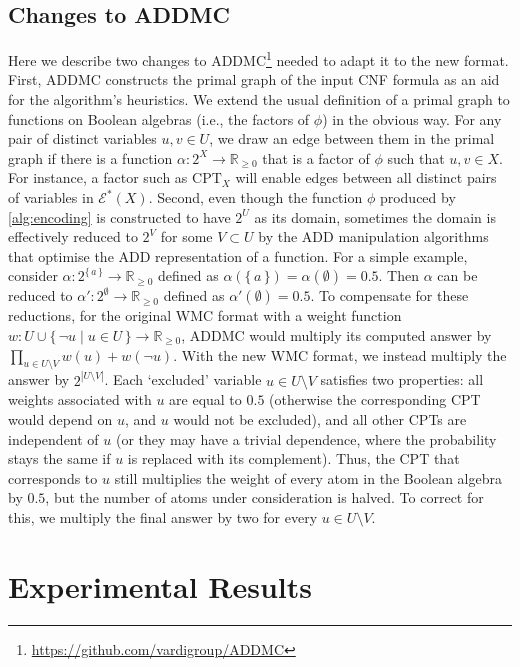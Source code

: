 \subsection{Changes to \textsc{ADDMC}}

Here we describe two changes to
\textsc{ADDMC}\footnote{\url{https://github.com/vardigroup/ADDMC}}
\citep{DBLP:conf/aaai/DudekPV20} needed to adapt it to the new format. First,
\textsc{ADDMC} constructs the primal graph of the input CNF formula as an aid
for the algorithm's heuristics. We extend the usual definition of a primal graph
to functions on Boolean algebras (i.e., the factors of $\phi$) in the obvious
way. For any pair of distinct variables $u, v \in U$, we draw an edge between
them in the primal graph if there is a function
$\alpha\colon 2^X \to \mathbb{R}_{\ge 0}$ that is a factor of $\phi$ such that
$u, v \in X$. For instance, a factor such as $\mathrm{CPT}_X$ will enable edges
between all distinct pairs of variables in $\mathcal{E}^*(X)$. Second, even
though the function $\phi$ produced by \cref{alg:encoding} is constructed to
have $2^U$ as its domain, sometimes the domain is effectively reduced to $2^V$
for some $V \subset U$ by the ADD manipulation algorithms that optimise the ADD
representation of a function. For a simple example, consider
$\alpha: 2^{\{\, a \,\}} \to \mathbb{R}_{\ge 0}$ defined as
$\alpha(\{\, a \,\}) = \alpha(\emptyset) = 0.5$. Then $\alpha$ can be reduced to
$\alpha'\colon 2^{\emptyset} \to \mathbb{R}_{\ge 0}$ defined as
$\alpha'(\emptyset) = 0.5$. To compensate for these reductions, for the original
WMC format with a weight function
$w\colon U \cup \{\, \neg u \mid u \in U \,\} \to \mathbb{R}_{\ge 0}$,
\textsc{ADDMC} would multiply its computed answer by
$\prod_{u \in U \setminus V} w(u) + w(\neg u)$. With the new WMC format, we
instead multiply the answer by $2^{|U \setminus V|}$. Each `excluded' variable
$u \in U \setminus V$ satisfies two properties: all weights associated with $u$
are equal to $0.5$ (otherwise the corresponding CPT would depend on $u$, and $u$
would not be excluded), and all other CPTs are independent of $u$ (or they may
have a trivial dependence, where the probability stays the same if $u$ is
replaced with its complement). Thus, the CPT that corresponds to $u$ still
multiplies the weight of every atom in the Boolean algebra by $0.5$, but the
number of atoms under consideration is halved. To correct for this, we multiply
the final answer by two for every $u \in U \setminus V$.

\section{Experimental Results}\label{sec:2experiments}

